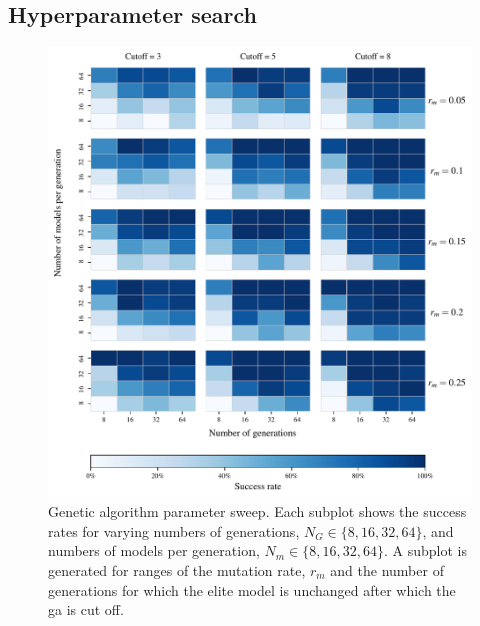 \subsection{Hyperparameter search}
\begin{figure}
    \begin{center}
        \includegraphics{theoretical_study/figures/gen_alg_param_sweep.pdf}
    \end{center}
    \caption[Genetic algorithm parameter sweep]{
        Genetic algorithm parameter sweep.
        Each subplot shows the success rates for varying numbers of generations, $N_G \in \{8, 16, 32, 64\}$, 
        and numbers of models per generation, $N_m \in \{8, 16, 32, 64\}$. 
        A subplot is generated for ranges of the mutation rate, $r_m$ and the number of 
        generations for which the elite model is unchanged after which the \gls{ga} is cut off. 
    }
    \label{fig:ga_param_sweep}
\end{figure}

